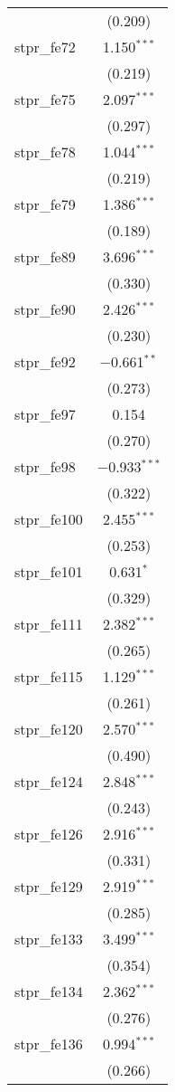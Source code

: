 \begin{table}[!htbp]
\begin{tabular}{@{\extracolsep{5pt}}lc}
  & (0.209) \\ 
  stpr\_fe72 & 1.150$^{***}$ \\ 
  & (0.219) \\ 
  stpr\_fe75 & 2.097$^{***}$ \\ 
  & (0.297) \\ 
  stpr\_fe78 & 1.044$^{***}$ \\ 
  & (0.219) \\ 
  stpr\_fe79 & 1.386$^{***}$ \\ 
  & (0.189) \\ 
  stpr\_fe89 & 3.696$^{***}$ \\ 
  & (0.330) \\ 
  stpr\_fe90 & 2.426$^{***}$ \\ 
  & (0.230) \\ 
  stpr\_fe92 & $-$0.661$^{**}$ \\ 
  & (0.273) \\ 
  stpr\_fe97 & 0.154 \\ 
  & (0.270) \\ 
  stpr\_fe98 & $-$0.933$^{***}$ \\ 
  & (0.322) \\ 
  stpr\_fe100 & 2.455$^{***}$ \\ 
  & (0.253) \\ 
  stpr\_fe101 & 0.631$^{*}$ \\ 
  & (0.329) \\ 
  stpr\_fe111 & 2.382$^{***}$ \\ 
  & (0.265) \\ 
  stpr\_fe115 & 1.129$^{***}$ \\ 
  & (0.261) \\ 
  stpr\_fe120 & 2.570$^{***}$ \\ 
  & (0.490) \\ 
  stpr\_fe124 & 2.848$^{***}$ \\ 
  & (0.243) \\ 
  stpr\_fe126 & 2.916$^{***}$ \\ 
  & (0.331) \\ 
  stpr\_fe129 & 2.919$^{***}$ \\ 
  & (0.285) \\ 
  stpr\_fe133 & 3.499$^{***}$ \\ 
  & (0.354) \\ 
  stpr\_fe134 & 2.362$^{***}$ \\ 
  & (0.276) \\ 
  stpr\_fe136 & 0.994$^{***}$ \\ 
  & (0.266) \\ 

\end{tabular}
\end{table}
